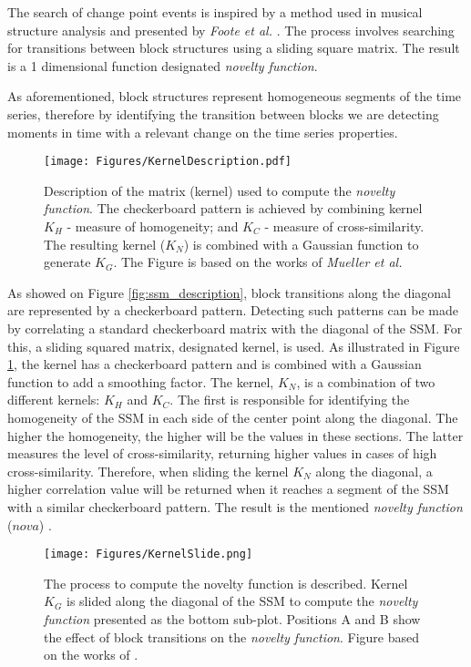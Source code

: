 The search of change point events is inspired by a method used in musical structure analysis and presented by \textit{Foote et al.} \cite{foote2000}. The process involves searching for transitions between block structures using a sliding square matrix. The result is a 1 dimensional function designated \textit{novelty function}.
\par
As aforementioned, block structures represent homogeneous segments of the time series, therefore by identifying the transition between blocks we are detecting moments in time with a relevant change on the time series properties. 

\begin{figure}
    \centering
    \texttt{[image: Figures/KernelDescription.pdf]}
    \caption{Description of the matrix (kernel) used to compute the \textit{novelty function}. The checkerboard pattern is achieved by combining kernel $K_H$ - measure of homogeneity; and $K_C$ - measure of cross-similarity. The resulting kernel ($K_N$) is combined with a Gaussian function to generate $K_G$. The Figure is based on the works of \textit{Mueller et al.} \cite{Mueller15_FMP_SPRINGER, MuellerZ19_FMP_ISMIR}}
    \label{fig:kernel_shape}
\end{figure}

As showed on Figure \ref{fig:ssm_description}, block transitions along the diagonal are represented by a checkerboard pattern. Detecting such patterns can be made by correlating a standard checkerboard matrix with the diagonal of the \gls{SSM}. For this, a sliding squared matrix, designated kernel, is used. As illustrated in Figure \ref{fig:kernel_shape}, the kernel has a checkerboard pattern and is combined with a Gaussian function to add a smoothing factor. The kernel, $K_N$, is a combination of two different kernels: $K_H$ and $K_C$. The first is responsible for identifying the homogeneity of the \gls{SSM} in each side of the center point along the diagonal. The higher the homogeneity, the higher will be the values in these sections. The latter measures the level of cross-similarity, returning higher values in cases of high cross-similarity. Therefore, when sliding the kernel $K_N$ along the diagonal, a higher correlation value will be returned when it reaches a segment of the \gls{SSM} with a similar checkerboard pattern. The result is the mentioned \textit{novelty function} ($nova$) \cite{Dannenberg2008, Mueller15_FMP_SPRINGER, MuellerZ19_FMP_ISMIR}.

\begin{figure}
    \centering
    \texttt{[image: Figures/KernelSlide.png]}
    \caption{The process to compute the novelty function is described. Kernel $K_G$ is slided along the diagonal of the \gls{SSM} to compute the \textit{novelty function} presented as the bottom sub-plot. Positions A and B show the effect of block transitions on the \textit{novelty function}. Figure based on the works of \cite{Dannenberg2008, Mueller15_FMP_SPRINGER, MuellerZ19_FMP_ISMIR}.}
    \label{fig:kernel_slide}
\end{figure}

